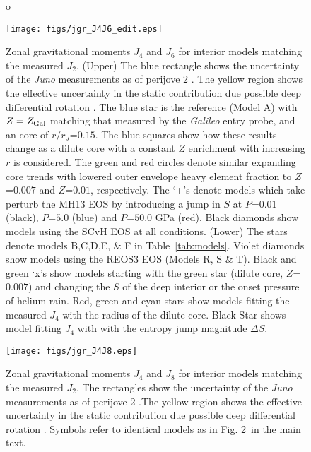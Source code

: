 \begin{figure}[h]o
\centering

\texttt{[image: figs/jgr\_J4J6\_edit.eps]}

\caption{Zonal gravitational moments $J_4$ and $J_6$ for interior models
    matching the measured $J_2$.
    (Upper) The blue rectangle shows the uncertainty of the \textit{Juno}
    measurements as of perijove 2 \citep{Folkner2017}. The yellow region shows the
    effective uncertainty in the static contribution due possible deep differential
    rotation \citep{Kaspi2017}. The blue star is the reference (Model A) with
    $Z=Z_{\rm Gal}$ matching that measured by the \textit{Galileo} entry probe, and
    an core of $r/r_J$=$0.15$. The blue squares show how these results change as a
    dilute core with a constant $Z$ enrichment with increasing $r$ is considered. The
    green and red circles denote similar expanding core trends with lowered outer
    envelope heavy element fraction to $Z$=$0.007$ and $Z$=$0.01$, respectively.  The
    `+'s denote models which take perturb the MH13 EOS by introducing a jump in $S$
    at $P$=$0.01$ (black), $P$=$5.0$ (blue) and $P$=$50.0$ GPa (red). Black diamonds
    show models using the SCvH EOS at all conditions.     
    (Lower) The stars denote models B,C,D,E, \& F in
    Table~\ref{tab:models}. Violet diamonds show models using the REOS3 EOS
    (Models R, S \& T).  Black and green `x's show models starting with the
    green star (dilute core, $Z$=$0.007$) and changing the $S$ of the deep
    interior or the onset pressure of helium rain. Red, green and cyan stars
show models fitting the measured $J_4$ with the radius of the dilute core.
Black Star shows model fitting $J_4$ with with the entropy jump magnitude
$\Delta S$. 
}
\label{fig:j4j6}
\end{figure}


\begin{figure}[h]
\centering

\texttt{[image: figs/jgr\_J4J8.eps]}

\caption{ Zonal gravitational moments $J_4$ and $J_8$ for interior models
    matching the measured $J_2$. The rectangles show the uncertainty of the
    \textit{Juno} measurements as of perijove 2 \citep{Folkner2017}.The yellow region
    shows the effective uncertainty in the static contribution due possible deep
    differential rotation \citep{Kaspi2017}. Symbols refer to identical models as in
Fig. 2~in the main text. }
\label{fig:j4j8}
\end{figure}


